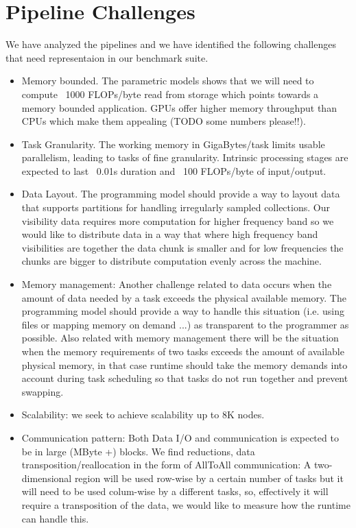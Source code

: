 \section{Pipeline Challenges}

We have analyzed the pipelines and we have identified the following challenges that need representaion in our benchmark suite.

\begin{itemize}
\item Memory bounded. The parametric models shows that we will need to compute ~1000 FLOPs/byte read from storage which points towards a memory 
bounded application. GPUs offer higher memory throughput than CPUs which make them appealing (TODO some numbers please!!). 
\item Task Granularity. The working memory in GigaBytes/task limits usable parallelism, leading to tasks of fine granularity. Intrinsic processing
stages are expected to last  ~0.01s duration and ~100 FLOPs/byte of input/output. 
\item Data Layout. The programming model should provide a way to layout data that supports partitions for handling irregularly sampled collections.
Our visibility data requires more computation for higher frequency band so we would like to distribute data in a way that where high frequency band
visibilities are together the data chunk is smaller and for low frequencies the chunks are bigger to distribute computation evenly across the machine.
\item Memory management: Another challenge related to data occurs when the amount of data needed by a task exceeds the physical available memory. 
The programming model should provide a way to handle this situation (i.e. using files or mapping memory on demand ...) as transparent to the programmer as possible. Also related with memory management there will be the situation when the memory requirements of two tasks exceeds the amount of available physical memory, in that case runtime should take the memory demands into account during task scheduling so that tasks do not run together and prevent swapping.  
\item Scalability: we seek to achieve scalability up to 8K nodes.
\item Communication pattern: Both Data I/O and communication is expected to be in large (MByte +) blocks. We find reductions, data transposition/reallocation 
in the form of AllToAll communication: A two-dimensional region will be used row-wise by a certain number of tasks but it will need to be used colum-wise by a different tasks, so, effectively it will require a transposition of the data, we would like to measure how the runtime can handle this.

\end{itemize}

